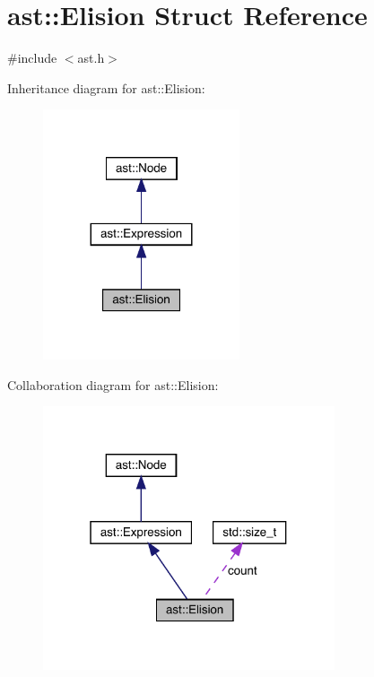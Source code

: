 \hypertarget{structast_1_1_elision}{}\section{ast\+:\+:Elision Struct Reference}
\label{structast_1_1_elision}


{\ttfamily \#include $<$ast.\+h$>$}



Inheritance diagram for ast\+:\+:Elision\+:
\nopagebreak
\begin{figure}[H]
\begin{center}
\leavevmode
\includegraphics[width=164pt]{structast_1_1_elision__inherit__graph}
\end{center}
\end{figure}


Collaboration diagram for ast\+:\+:Elision\+:
\nopagebreak
\begin{figure}[H]
\begin{center}
\leavevmode
\includegraphics[width=244pt]{structast_1_1_elision__coll__graph}
\end{center}
\end{figure}
